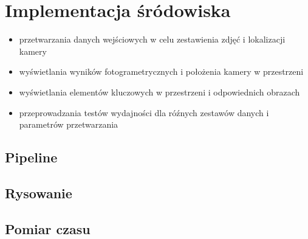 \section{Implementacja śródowiska}
\begin{itemize}
\item przetwarzania danych wejściowych w celu zestawienia zdjęć i lokalizacji kamery
\item wyświetlania wyników fotogrametrycznych i położenia kamery w przestrzeni
\item wyświetlania elementów kluczowych w przestrzeni i odpowiednich obrazach
\item przeprowadzania testów wydajności dla róźnych zestawów danych i parametrów przetwarzania
\end{itemize}

\subsection{Pipeline}
\subsection{Rysowanie}
\subsection{Pomiar czasu}
